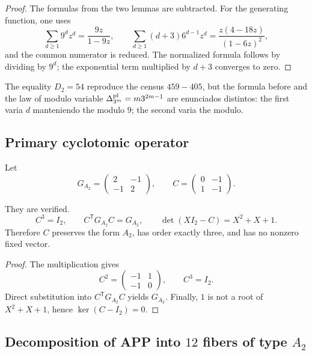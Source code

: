 \begin{proof}
The formulas from the two lemmas are subtracted. For the generating function, one uses
\[
 \sum_{d\geq1}9^dz^d=\frac{9z}{1-9z},
 \qquad
 \sum_{d\geq1}(d+3)6^{d-1}z^d
 =\frac{z(4-18z)}{(1-6z)^2},
\]
and the common numerator is reduced. The normalized formula follows by dividing
by \(9^d\); the exponential term multiplied by \(d+3\) converges to
zero.
\end{proof}

The equality \(D_2=54\) reproduce the census \(459-405\), but the formula
before and the law of modulo variable
\(\Delta_{3^m}^{\rm pl}=m3^{2m-1}\) are enunciados distintos: the first
varia \(d\) manteniendo the modulo \(9\); the second varia the modulo.

\subsection{Primary cyclotomic operator}

Let
\[
 G_{A_2}=\begin{pmatrix}2&-1\\-1&2\end{pmatrix},
 \qquad
 C=\begin{pmatrix}0&-1\\1&-1\end{pmatrix}.
\]

\begin{proposition}
\label{p12-83-c1-s5:prop:coxeter-a2-autonomo}
They are verified.
\[
 C^3=I_2,
 \qquad
 C^{\mathsf T}G_{A_2}C=G_{A_2},
 \qquad
 \det(XI_2-C)=X^2+X+1.
\]
Therefore \(C\) preserves the form \(A_2\), has order exactly three, and
has no nonzero fixed vector.
\end{proposition}

\begin{proof}
The multiplication gives
\[
 C^2=\begin{pmatrix}-1&1\\-1&0\end{pmatrix},
 \qquad C^3=I_2.
\]
Direct substitution into \(C^{\mathsf T}G_{A_2}C\) yields
\(G_{A_2}\). Finally, \(1\) is not a root of \(X^2+X+1\), hence
\(\ker(C-I_2)=0\).
\end{proof}

\subsection{Decomposition of APP into \(12\) fibers of type \(A_2\)}

